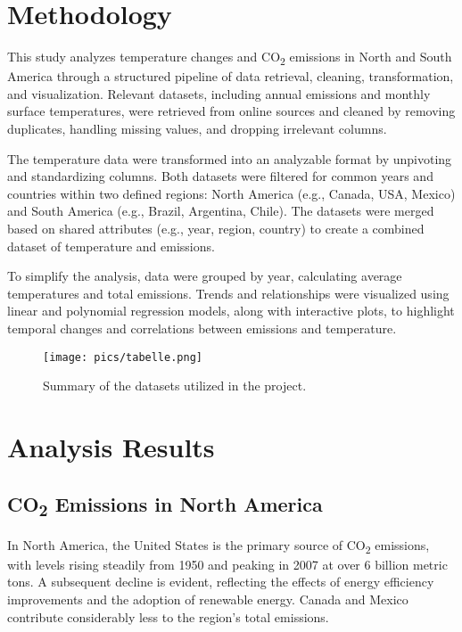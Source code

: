 \documentclass[a4paper,12pt]{article}
\begin{document}
\section{Methodology}
This study analyzes temperature changes and CO\textsubscript{2} emissions in North and South America through a structured pipeline of data retrieval, cleaning, transformation, and visualization. Relevant datasets, including annual emissions and monthly surface temperatures, were retrieved from online sources and cleaned by removing duplicates, handling missing values, and dropping irrelevant columns.

\noindent
The temperature data were transformed into an analyzable format by unpivoting and standardizing columns. Both datasets were filtered for common years and countries within two defined regions: North America (e.g., Canada, USA, Mexico) and South America (e.g., Brazil, Argentina, Chile). The datasets were merged based on shared attributes (e.g., year, region, country) to create a combined dataset of temperature and emissions.

\noindent
To simplify the analysis, data were grouped by year, calculating average temperatures and total emissions. Trends and relationships were visualized using linear and polynomial regression models, along with interactive plots, to highlight temporal changes and correlations between emissions and temperature.

\begin{figure}[htbp]
    \centering
    \texttt{[image: pics/tabelle.png]} 
    \caption{Summary of the datasets utilized in the project.}
    \label{fig:dataset-overview}
\end{figure}

\section{Analysis Results}

\subsection{CO\textsubscript{2} Emissions in North America}
In North America, the United States is the primary source of CO\textsubscript{2} emissions, with levels rising steadily from 1950 and peaking in 2007 at over 6 billion metric tons. A subsequent decline is evident, reflecting the effects of energy efficiency improvements and the adoption of renewable energy. Canada and Mexico contribute considerably less to the region’s total emissions.
\end{document}
